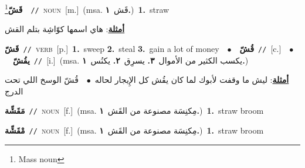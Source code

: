 \documentclass[10pt,a4paper,twoside]{article} %
\begin{document}
\begin{multicols}{2}
{\setlength\topsep{0pt}\textbf{\foreignlanguage{arabic}{قَشّ}}\footnote{Mass noun}\ \ {\color{gray}\texttt{//}\color{black}}\ \textsc{noun}\ [m.]\ \color{gray}(msa. \foreignlanguage{arabic}{قَش}~\foreignlanguage{arabic}{\textbf{١.}})\color{black}\ \textbf{1.}~straw\  \begin{flushright}\color{gray}\foreignlanguage{arabic}{\textbf{\underline{\foreignlanguage{arabic}{أمثلة}}}: هاي اسمها كوّاشِة بتلم القش}\end{flushright}\color{black}} \vspace{2mm}

{\setlength\topsep{0pt}\textbf{\foreignlanguage{arabic}{قَشّ}}\ {\color{gray}\texttt{//}\color{black}}\ \textsc{verb}\ [p.]\ \textbf{1.}~sweep  \textbf{2.}~steal  \textbf{3.}~gain a lot of money\ \ $\bullet$\ \ \setlength\topsep{0pt}\textbf{\foreignlanguage{arabic}{قُشّ}}\ {\color{gray}\texttt{//}\color{black}}\ [c.]\ \ $\bullet$\ \ \setlength\topsep{0pt}\textbf{\foreignlanguage{arabic}{يقُشّ}}\ {\color{gray}\texttt{//}\color{black}}\ [i.]\ \color{gray}(msa. \foreignlanguage{arabic}{يكسب الكثير من الأموال}~\foreignlanguage{arabic}{\textbf{٣.}}  \foreignlanguage{arabic}{يسرِق}~\foreignlanguage{arabic}{\textbf{٢.}}  \foreignlanguage{arabic}{يكنُس}~\foreignlanguage{arabic}{\textbf{١.}})\color{black}\  \begin{flushright}\color{gray}\foreignlanguage{arabic}{\textbf{\underline{\foreignlanguage{arabic}{أمثلة}}}: ليش ما وقفت لأبوك لما كان يقُش كل الإِيجار لحاله\ $\bullet$\ \  قُشّ الوسخ اللي تحت الدرج}\end{flushright}\color{black}} \vspace{2mm}

{\setlength\topsep{0pt}\textbf{\foreignlanguage{arabic}{مَقَشِّة}}\ {\color{gray}\texttt{//}\color{black}}\ \textsc{noun}\ [f.]\ \color{gray}(msa. \foreignlanguage{arabic}{مِكنِسَة مصنوعة من القَش}~\foreignlanguage{arabic}{\textbf{١.}})\color{black}\ \textbf{1.}~straw broom\ } \vspace{2mm}

{\setlength\topsep{0pt}\textbf{\foreignlanguage{arabic}{مْقَشِّة}}\ {\color{gray}\texttt{//}\color{black}}\ \textsc{noun}\ [f.]\ \color{gray}(msa. \foreignlanguage{arabic}{مِكنِسَة مصنوعة من القَش}~\foreignlanguage{arabic}{\textbf{١.}})\color{black}\ \textbf{1.}~straw broom\ } \vspace{2mm}


\end{multicols}
\end{document}
